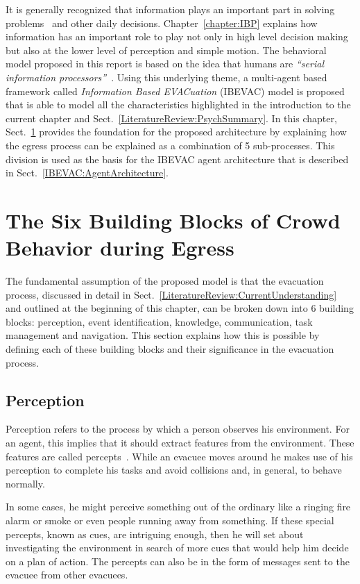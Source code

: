 It is generally recognized that information plays an important part in solving problems~\cite{Simon:1970th} and other daily decisions. Chapter~\ref{chapter:IBP} explains how information has an important role to play not only in high level decision making but also at the lower level of perception and simple motion. The behavioral model proposed in this report is based on the idea that humans are \emph{``serial information processors''}~\cite{Ozel:2001tn}. Using this underlying theme, a multi-agent based framework called \emph{Information Based EVACuation} (IBEVAC) model is proposed that is able to model all the characteristics highlighted in the introduction to the current chapter and Sect.~\ref{LiteratureReview:PsychSummary}. In this chapter, Sect.~\ref{IBEVAC:EgressProgress} provides the foundation for the proposed architecture by explaining how the egress process can be explained as a combination of 5 sub-processes. This division is used as the basis for the IBEVAC agent architecture that is described in Sect.~\ref{IBEVAC:AgentArchitecture}.

\section{The Six Building Blocks of Crowd Behavior during Egress}
\label{IBEVAC:EgressProgress}
The fundamental assumption of the proposed model is that the evacuation process, discussed in detail in Sect.~\ref{LiteratureReview:CurrentUnderstanding} and outlined at the beginning of this chapter, can be broken down into 6 building blocks: perception, event identification, knowledge, communication, task management and navigation. This section explains how this is possible by defining each of these building blocks and their significance in the evacuation process.

\subsection{Perception}
\label{IBEVAC:IBP}
	Perception refers to the process by which a person observes his environment. For an agent, this implies that it should extract features from the environment. These features are called percepts~\cite{Russel:1995vi}. While an evacuee moves around he makes use of his perception to complete his tasks and avoid collisions and, in general, to behave normally. 

	In some cases, he might perceive something out of the ordinary like a ringing fire alarm or smoke or even people running away from something. If these special percepts, known as cues, are intriguing enough, then he will set about investigating the environment in search of more cues that would help him decide on a plan of action. The percepts can also be in the form of messages sent to the evacuee from other evacuees.
	
